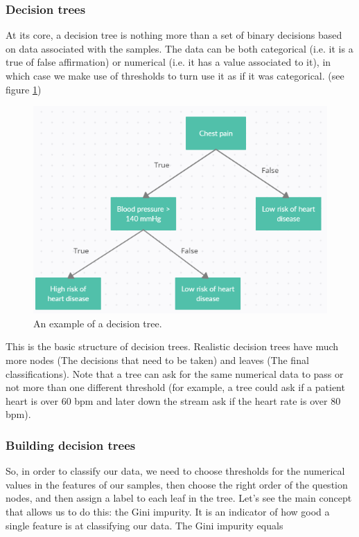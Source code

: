 \documentclass[a4paper]{report}
\begin{document}
\subsubsection{Decision trees}
 At its core, a decision tree is nothing more than a set of binary decisions based on data associated with the samples.
The data can be both categorical (i.e.  it is a true of false affirmation) or numerical (i.e.  it has a value associated to it), in which case we make use of thresholds to turn use it as if it was categorical.
(see figure \ref{chestt})

\begin{figure} [H]
    \centering
    \includegraphics [width=12cm] {o/chestt.png}
    \caption{An example of a decision tree.}
    \label{chestt}
\end{figure}

This is the basic structure of decision trees.
Realistic decision trees have much more nodes (The decisions that need to be taken) and leaves (The final classifications).
Note that a tree can ask for the same numerical data to pass or not more than one different threshold (for example, a tree could ask if a patient heart is over 60 bpm and later down the stream ask if the heart rate is over 80 bpm).

\subsubsection{Building decision trees}

So, in order to classify our data, we need to choose thresholds for the numerical values in the features of our samples, then choose the right order of the question nodes, and then assign a label to each leaf in the tree.
Let's see the main concept that allows us to do this:
the Gini impurity.
It is an indicator of how good a single feature is at classifying our data.
The Gini impurity equals
\end{document}
